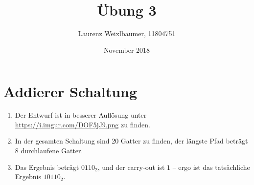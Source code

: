 \documentclass{article}
\title{Übung 3}
\author{Laurenz Weixlbaumer, 11804751}
\date{November 2018}
\begin{document}
\maketitle

\section{Addierer Schaltung}

\begin{enumerate}[label=(\alph*)]
\item Der Entwurf ist in besserer Auflösung unter \url{https://i.imgur.com/DOF5jJ9.png} zu finden.

\begin{center}
\end{center}

\item In der gesamten Schaltung sind 20 Gatter zu finden, der längste Pfad beträgt 8 durchlaufene Gatter.

\item Das Ergebnis beträgt $0110_2$, und der carry-out ist $1$ -- ergo ist das tatsächliche Ergebnis $10110_2$.

\end{enumerate}
\end{document}
